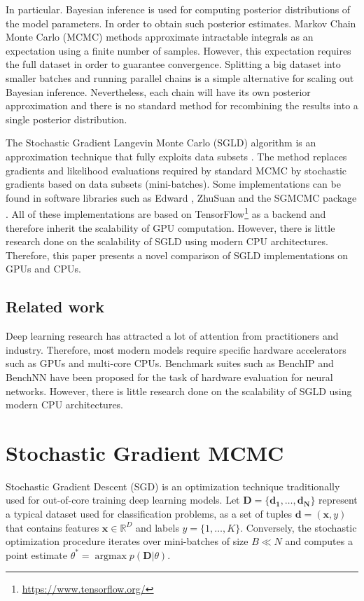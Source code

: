 \documentclass[conference]{IEEEtran}
\begin{document}
In particular. Bayesian inference is used for computing posterior distributions of the model parameters. In order to obtain such posterior estimates. Markov Chain Monte Carlo (MCMC) methods approximate intractable integrals as an expectation using a finite number of samples. However, this expectation requires the full dataset in order to guarantee convergence.  Splitting a big dataset into smaller batches and running parallel chains is a simple alternative for scaling out Bayesian inference. Nevertheless, each chain will have its own posterior approximation and there is no standard method for recombining the results into a single posterior distribution. 

The Stochastic Gradient Langevin Monte Carlo (SGLD) algorithm is an approximation technique that fully exploits data subsets \cite{welling2011bayesian}. The method replaces gradients and likelihood evaluations required by standard MCMC by stochastic gradients based on data subsets (mini-batches). Some implementations can be found in software libraries such as Edward \cite{Tran2018}, ZhuSuan \cite{zhusuan2017} and the SGMCMC package \cite{baker2017sgmcmc}. All of these implementations are based on TensorFlow\footnote{\url{https://www.tensorflow.org/}} as a backend and therefore inherit the scalability of GPU computation. However, there is little research done on the scalability of SGLD using modern CPU architectures. Therefore, this paper presents a novel comparison of SGLD implementations on GPUs and CPUs. 
% 
\subsection{Related work}
Deep learning research has attracted a lot of attention from practitioners and industry. Therefore, most modern models require specific hardware accelerators such as GPUs and multi-core CPUs. Benchmark suites such as BenchIP \cite{Tao2018} and BenchNN \cite{Chen2012} have been proposed for the task of hardware evaluation for neural networks. However, there is little research done on the scalability of SGLD using modern CPU architectures. 

\section{Stochastic Gradient MCMC}
Stochastic Gradient Descent (SGD) is an optimization technique traditionally used for out-of-core training deep learning models. Let $\mathbf{D}=\{\mathbf{d_1},\ldots,\mathbf{d_N}\}$ represent a typical dataset used for classification problems, as a set of tuples $\mathbf{d}=(\mathbf x,y)$ that contains features $\mathbf x \in \mathbb R^D$ and labels $y=\{1,\ldots,K\}$. Conversely, the stochastic optimization procedure iterates  over mini-batches of size $B \ll N$ and computes a point estimate $\theta^\ast = \operatorname{argmax} p(\mathbf{D} \vert \theta)$.
\end{document}
